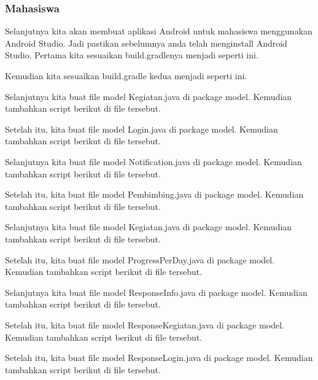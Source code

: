 \subsubsection{Mahasiswa}

Selanjutnya kita akan membuat aplikasi Android untuk mahasiswa menggunakan Android Studio. Jadi pastikan sebelumnya anda telah menginstall Android Studio. Pertama kita sesuaikan build.gradlenya menjadi seperti ini.


Kemudian kita sesuaikan build.gradle kedua menjadi seperti ini.


Selanjutnya kita buat file model Kegiatan.java di package model. Kemudian tambahkan script berikut di file tersebut.


Setelah itu, kita buat file model Login.java di package model. Kemudian tambahkan script berikut di file tersebut.


Selanjutnya kita buat file model Notification.java di package model. Kemudian tambahkan script berikut di file tersebut.


Setelah itu, kita buat file model Pembimbing.java di package model. Kemudian tambahkan script berikut di file tersebut.


Selanjutnya kita buat file model Kegiatan.java di package model. Kemudian tambahkan script berikut di file tersebut.


Setelah itu, kita buat file model ProgressPerDay.java di package model. Kemudian tambahkan script berikut di file tersebut.


Selanjutnya kita buat file model ResponseInfo.java di package model. Kemudian tambahkan script berikut di file tersebut.


Setelah itu, kita buat file model ResponseKegiatan.java di package model. Kemudian tambahkan script berikut di file tersebut.


Setelah itu, kita buat file model ResponseLogin.java di package model. Kemudian tambahkan script berikut di file tersebut.


